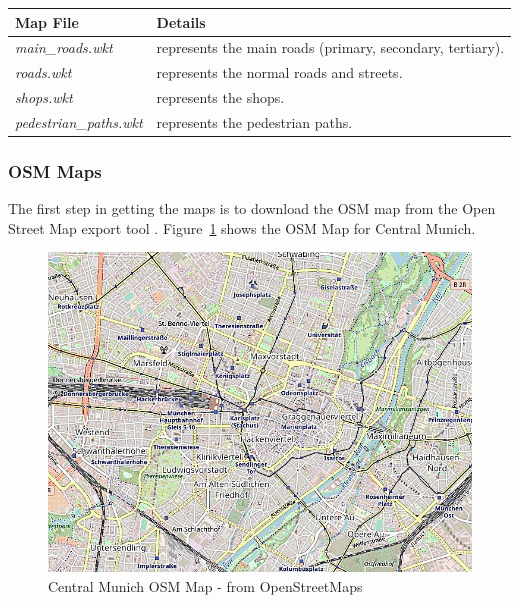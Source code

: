 	\begin{center}
    	 \label{tab:wktMapFiles}
	    \begin{tabular}{ | l | p{10.5cm} |}
    		\hline
    		\textbf{Map File} & \textbf{Details} \\ \hline
    		\textit{main\_roads.wkt} & represents the main roads (primary, secondary, tertiary). \\ \hline
    		\textit{roads.wkt} & represents the normal roads and streets.  \\ \hline
    		\textit{shops.wkt} & represents the shops. \\ \hline
    		\textit{pedestrian\_paths.wkt} & represents the pedestrian paths. \\ \hline
    	\end{tabular}
	\end{center}

	\subsubsection{OSM Maps}
	The first step in getting the maps is to download the OSM map from the Open Street Map export tool \cite{openstreetmap-export}. Figure~\ref{fig:munich-map} shows the OSM Map for Central Munich.
	\newline
	\begin{figure}[h]
		\centering
		\includegraphics[scale=0.5]{./figures/central-munich-osm}
		\caption{Central Munich OSM Map - from OpenStreetMaps \cite{openstreetmap}}
		\label{fig:munich-map}
	\end{figure}

